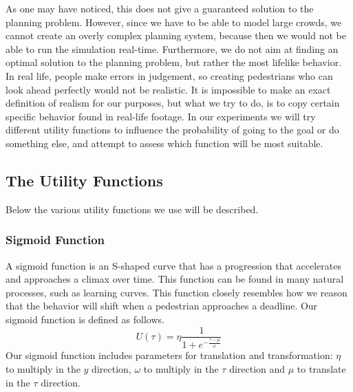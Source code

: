 \documentclass[11pt, a4paper]{book}
\begin{document}
As one may have noticed, this does not give a guaranteed solution to the planning problem. However, since we have to be able to model large crowds, we cannot create an overly complex planning system, because then we would not be able to run the simulation real-time. Furthermore, we do not aim at finding an optimal solution to the planning problem, but rather the most lifelike behavior. In real life, people make errors in judgement, so creating pedestrians who can look ahead perfectly would not be realistic. It is impossible to make an exact definition of realism for our purposes, but what we try to do, is to copy certain specific behavior found in real-life footage. In our experiments we will try different utility functions to influence the probability of going to the goal or do something else, and attempt to assess which function will be most suitable.


\subsection{The Utility Functions}
\label{subsec:utility}
Below the various utility functions we use will be described. 

\subsubsection{Sigmoid Function}
A sigmoid function is an S-shaped curve that has a progression that accelerates and approaches a climax over time. This function can be found in many natural processes, such as learning curves. This function closely resembles how we reason that the behavior will shift when a pedestrian approaches a deadline.
Our sigmoid function is defined as follows.
\begin{equation}
U(\tau) = \eta \frac{1}{1+e^{-\frac{\tau-\mu}{\omega}}} 
\end{equation}
Our sigmoid function includes parameters for translation and transformation: $\eta$ to multiply in the $y$ direction, $\omega$ to multiply in the $\tau$ direction and $\mu$ to translate in the $\tau$ direction.

\end{document}
